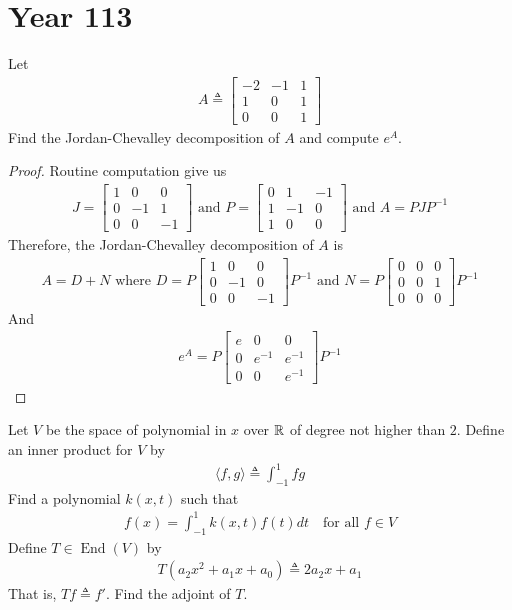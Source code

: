 \documentclass{report}
\begin{document}
\section{Year 113}
\begin{question}{}{}
Let 
\begin{align*}
A\triangleq  \begin{bmatrix}
  -2 & -1 & 1\\
  1 & 0 & 1\\
  0 & 0 & 1
\end{bmatrix}
\end{align*}
Find the Jordan-Chevalley decomposition of $A$ and compute  $e^A$. 
\end{question}
\begin{proof}
Routine computation give us 
\begin{align*}
J=\begin{bmatrix}
  1 & 0 & 0 \\
  0 & -1 & 1\\
  0 & 0 & -1
\end{bmatrix}\text{ and }P=\begin{bmatrix}
  0 & 1 & -1 \\
  1 & -1 & 0 \\
  1 & 0 & 0
\end{bmatrix}\text{ and }A=PJP^{-1}
\end{align*}
Therefore, the Jordan-Chevalley decomposition of $A$ is 
\begin{align*}
A= D+ N \text{ where }D=P\begin{bmatrix}
  1 & 0 & 0 \\
  0 & -1 & 0 \\
  0 & 0 & -1 
\end{bmatrix}P^{-1}\text{ and }N=P\begin{bmatrix}
0 & 0 & 0 \\
0 & 0 & 1 \\
0 & 0 & 0
\end{bmatrix}P ^{-1}
\end{align*}
And 
\begin{align*}
e^A= P\begin{bmatrix}
  e & 0 & 0\\
  0 & e^{-1} & e^{-1} \\
  0 & 0 & e^{-1}
\end{bmatrix} P^{-1}
\end{align*}
\end{proof}
\begin{question}{}{}
Let $V$ be the space of polynomial in $x$ over  $\mathbb{R}$ of degree not higher than  $2$. Define an inner product for $V$ by 
\begin{align*}
\langle f,g\rangle \triangleq \int_{-1}^{1} fg
\end{align*}
Find a polynomial $k(x,t)$ such that 
\begin{align}
\label{fx=}
f(x)= \int_{-1}^{1}k(x,t)f(t)dt \quad\text{for all }f \in V
\end{align}
Define $T \in \operatorname{End}(V)$ by 
\begin{align*}
T(a_2x^2+a_1x+a_0) \triangleq 2a_2x+a_1
\end{align*}
That is, $Tf\triangleq f'$. Find the adjoint of $T$. 
\end{question}
\end{document}

